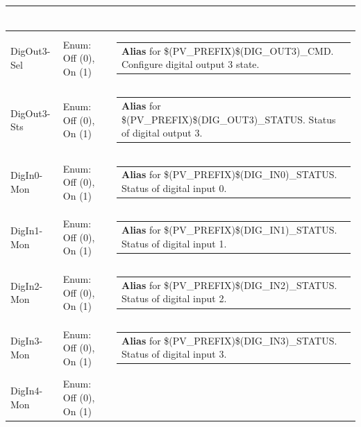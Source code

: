 \documentclass[openany]{article}
\begin{document}
\begin{longtable}{| m{4.5cm} m{2.5cm}  m{8.5cm} |}
\begin{tabular}{@{}m{6cm}@{}}
            \end{tabular} \hypertarget{pv:dig-out-3}{}\\ \hline
        DigOut3-Sel & Enum: Off (0), On (1) & \begin{tabular}{@{}m{6cm}@{}}
                \textbf{\color{blue} Alias} for \$(PV\_PREFIX)\$(DIG\_OUT3)\_CMD. Configure digital output 3 state.
            \end{tabular} \hypertarget{}{}\\ \hline
        DigOut3-Sts & Enum: Off (0), On (1) & \begin{tabular}{@{}m{6cm}@{}}
                \textbf{\color{blue} Alias} for \$(PV\_PREFIX)\$(DIG\_OUT3)\_STATUS. Status of digital output 3.
            \end{tabular} \hypertarget{pv:dig-in-0}{}\\ \hline
        DigIn0-Mon & Enum: Off (0), On (1) & \begin{tabular}{@{}m{6cm}@{}}
                \textbf{\color{blue} Alias} for \$(PV\_PREFIX)\$(DIG\_IN0)\_STATUS. Status of digital input 0.
            \end{tabular} \hypertarget{pv:dig-in-1}{}\\ \hline
        DigIn1-Mon & Enum: Off (0), On (1) & \begin{tabular}{@{}m{6cm}@{}}
                \textbf{\color{blue} Alias} for \$(PV\_PREFIX)\$(DIG\_IN1)\_STATUS. Status of digital input 1.
            \end{tabular} \hypertarget{pv:dig-in-2}{}\\ \hline
        DigIn2-Mon & Enum: Off (0), On (1) & \begin{tabular}{@{}m{6cm}@{}}
                \textbf{\color{blue} Alias} for \$(PV\_PREFIX)\$(DIG\_IN2)\_STATUS. Status of digital input 2.
            \end{tabular} \hypertarget{pv:dig-in-3}{}\\ \hline
        DigIn3-Mon & Enum: Off (0), On (1) & \begin{tabular}{@{}m{6cm}@{}}
                \textbf{\color{blue} Alias} for \$(PV\_PREFIX)\$(DIG\_IN3)\_STATUS. Status of digital input 3.
            \end{tabular} \hypertarget{pv:dig-in-4}{}\\ \hline
        DigIn4-Mon & Enum: Off (0), On (1) & \begin{tabular}{@{}m{6cm}@{}}

\end{tabular}
\end{longtable}
\end{document}
